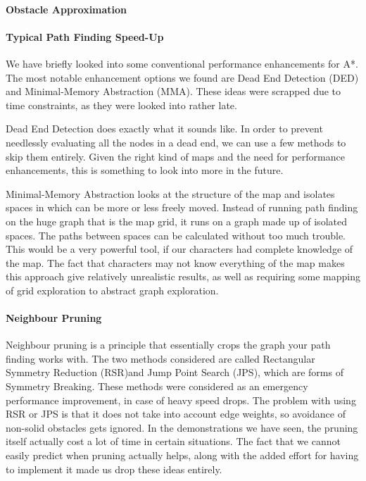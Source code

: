 \paragraph{Obstacle Approximation}


\paragraph{Typical Path Finding Speed-Up}
We have briefly looked into some conventional performance enhancements for A*. The most notable enhancement options we found are Dead End Detection (DED) and Minimal-Memory Abstraction (MMA). These ideas were scrapped due to time constraints, as they were looked into rather late. 

Dead End Detection does exactly what it sounds like. In order to prevent needlessly evaluating all the nodes in a dead end, we can use a few methods to skip them entirely. Given the right kind of maps and the need for performance enhancements, this is something to look into more in the future.

Minimal-Memory Abstraction looks at the structure of the map and isolates spaces in which can be more or less freely moved. Instead of running path finding on the huge graph that is the map grid, it runs on a graph made up of isolated spaces. The paths between spaces can be calculated without too much trouble. This would be a very powerful tool, if our characters had complete knowledge of the map. The fact that characters may not know everything of the map makes this approach give relatively unrealistic results, as well as requiring some mapping of grid exploration to abstract graph exploration.

\paragraph{Neighbour Pruning}
Neighbour pruning is a principle that essentially crops the graph your path finding works with. The two methods considered are called Rectangular Symmetry Reduction (RSR)and Jump Point Search (JPS), which are forms of Symmetry Breaking. These methods were considered as an emergency performance improvement, in case of heavy speed drops. The problem with using RSR or JPS is that it does not take into account edge weights, so avoidance of non-solid obstacles gets ignored. In the demonstrations we have seen, the pruning itself actually cost a lot of time in certain situations. The fact that we cannot easily predict when pruning actually helps, along with the added effort for having to implement it made us drop these ideas entirely.

